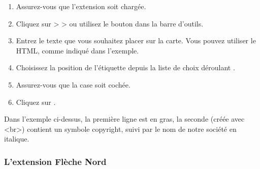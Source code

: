 \begin{enumerate}
\item Assurez-vous que l'extension soit chargée.
\item Cliquez sur  >  >  ou utilisez le bouton  dans la barre d'outils.
\item Entrez le texte que vous souhaitez placer sur la carte. Vous pouvez utiliser le HTML, comme
  indiqué dans l'exemple.
\item Choisissez la position de l'étiquette depuis la liste de choix déroulant .
\item Assurez-vous que la case  soit cochée.
\item Cliquez sur .
\end{enumerate}

Dans l'exemple ci-dessus, la première ligne est en gras, la seconde (créée avec
\textless br\textgreater) contient un symbole copyright, suivi par le nom de notre société
en italique.

\subsubsection{L'extension Flèche Nord}

